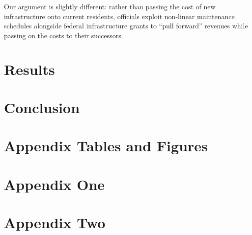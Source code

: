 \documentclass[12pt]{article}
\begin{document}
Our argument is slightly different: rather than passing the cost of new infrastructure onto current residents, officials exploit non-linear maintenance schedules alongside federal infrastructure grants to ``pull forward'' revenues while passing on the costs to their successors.



\section{Results \label{sec:results}}

% 



% 


% 


\section{Conclusion\label{sec:conclusion}}


\clearpage
\begin{singlespace}

%
%

\end{singlespace}


\newpage
\appendix
\setcounter{table}{0}
\renewcommand{\tablename}{Appendix Table}
\renewcommand{\figurename}{Appendix Figure}
\renewcommand{\thetable}{A\arabic{table}}
\setcounter{figure}{0}
\renewcommand{\thefigure}{A\arabic{figure}}

\section{Appendix Tables and Figures}
% 

\newpage 
\section{Appendix One \label{sec:appendix:first}}
\renewcommand{\thetable}{B\arabic{table}}
\setcounter{table}{0}
\renewcommand{\thefigure}{B\arabic{figure}}
\setcounter{figure}{0}

% 

\newpage
\section{Appendix Two
\label{sec:appendix:two}}
\renewcommand{\thetable}{C\arabic{table}}
\setcounter{table}{0}
\renewcommand{\thefigure}{C\arabic{figure}}
\setcounter{figure}{0}
\end{document}

